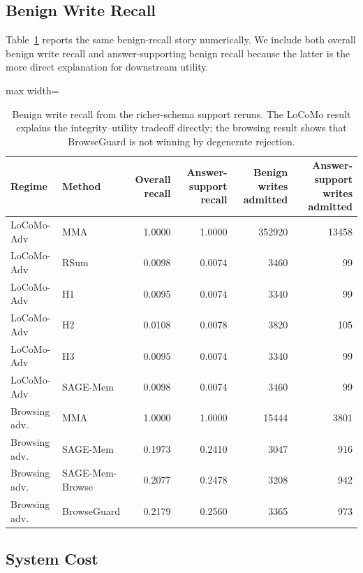 \documentclass{article}
\begin{document}
\subsection{Benign Write Recall}

Table~\ref{tab:appendix-benign-recall} reports the same benign-recall story numerically. We include both overall benign write recall and answer-supporting benign recall because the latter is the more direct explanation for downstream utility.

\begin{table}[t]
\centering
\caption{Benign write recall from the richer-schema support reruns. The LoCoMo result explains the integrity--utility tradeoff directly; the browsing result shows that BrowseGuard is not winning by degenerate rejection.}
\label{tab:appendix-benign-recall}
\small
\setlength{\tabcolsep}{4.5pt}
\renewcommand{\arraystretch}{0.96}
\begin{adjustbox}{max width=\textwidth}
\begin{tabular}{llrrrr}
\toprule
Regime & Method & Overall recall & Answer-support recall & Benign writes admitted & Answer-support writes admitted \\
\midrule
LoCoMo-Adv & MMA & 1.0000 & 1.0000 & 352920 & 13458 \\
LoCoMo-Adv & RSum & 0.0098 & 0.0074 & 3460 & 99 \\
LoCoMo-Adv & H1 & 0.0095 & 0.0074 & 3340 & 99 \\
LoCoMo-Adv & H2 & 0.0108 & 0.0078 & 3820 & 105 \\
LoCoMo-Adv & H3 & 0.0095 & 0.0074 & 3340 & 99 \\
LoCoMo-Adv & SAGE-Mem & 0.0098 & 0.0074 & 3460 & 99 \\
\midrule
Browsing adv. & MMA & 1.0000 & 1.0000 & 15444 & 3801 \\
Browsing adv. & SAGE-Mem & 0.1973 & 0.2410 & 3047 & 916 \\
Browsing adv. & SAGE-Mem-Browse & 0.2077 & 0.2478 & 3208 & 942 \\
Browsing adv. & BrowseGuard & 0.2179 & 0.2560 & 3365 & 973 \\
\bottomrule
\end{tabular}
\end{adjustbox}
\end{table}

\subsection{System Cost}
\end{document}
